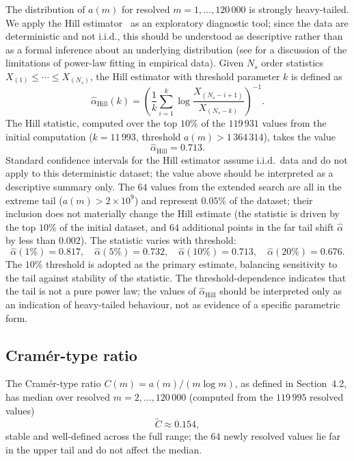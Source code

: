 \documentclass{amsart}
\theoremstyle{definition}
\theoremstyle{remark}
\numberwithin{equation}{section}
\begin{document}
The distribution of $a(m)$ for resolved $m = 1, \ldots, 120\,000$ is
strongly heavy-tailed.
We apply the Hill estimator~\cite{Hill1975} as an exploratory
diagnostic tool; since the data are deterministic and not
i.i.d., this should be understood as descriptive rather than as
a formal inference about an underlying distribution
(see \cite{Clauset2009} for a discussion of the limitations of
power-law fitting in empirical data).
Given $N_s$ order statistics $X_{(1)} \leq \cdots \leq X_{(N_s)}$, the
Hill estimator with threshold parameter $k$ is defined as
\[
\hat{\alpha}_{\mathrm{Hill}}(k)
= \left(
\frac{1}{k} \sum_{i=1}^{k}
\log \frac{X_{(N_s-i+1)}}{X_{(N_s-k)}}
\right)^{-1}.
\]
The Hill statistic, computed over the top $10\%$ of the $119\,931$
values from the initial computation
($k = 11\,993$, threshold $a(m) > 1\,364\,314$), takes the value
\[
\hat{\alpha}_{\mathrm{Hill}} = 0.713.
\]
Standard confidence intervals for the Hill estimator assume i.i.d.\
data and do not apply to this deterministic dataset; the value above
should be interpreted as a descriptive summary only.
The $64$ values from the extended search are all in the extreme tail
($a(m) > 2 \times 10^9$) and represent $0.05\%$ of the dataset;
their inclusion does not materially change the Hill estimate
(the statistic is driven by the top $10\%$ of the initial dataset,
and $64$ additional points in the far tail shift $\hat{\alpha}$ by
less than $0.002$).
The statistic varies with threshold:
\[
\hat{\alpha}(1\%) = 0.817, \quad
\hat{\alpha}(5\%) = 0.732, \quad
\hat{\alpha}(10\%) = 0.713, \quad
\hat{\alpha}(20\%) = 0.676.
\]
The $10\%$ threshold is adopted as the primary estimate,
balancing sensitivity to the tail against stability of the statistic.
The threshold-dependence indicates that the tail is not a pure power
law; the values of $\hat{\alpha}_{\mathrm{Hill}}$ should be interpreted
only as an indication of heavy-tailed behaviour, not as evidence of a
specific parametric form.

\subsection{Cram\'er-type ratio}

The Cram\'er-type ratio $C(m) = a(m)/(m \log m)$, as defined in
Section~4.2, has median over resolved $m = 2, \ldots, 120\,000$
(computed from the $119\,995$ resolved values)
\[
\widetilde{C} \approx 0.154,
\]
stable and well-defined across the full range; the $64$ newly resolved
values lie far in the upper tail and do not affect the median.
\end{document}
